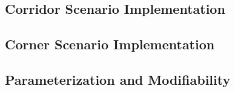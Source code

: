 
\subsection{Corridor Scenario Implementation}


\subsection{Corner Scenario Implementation}


\subsection{Parameterization and Modifiability}

